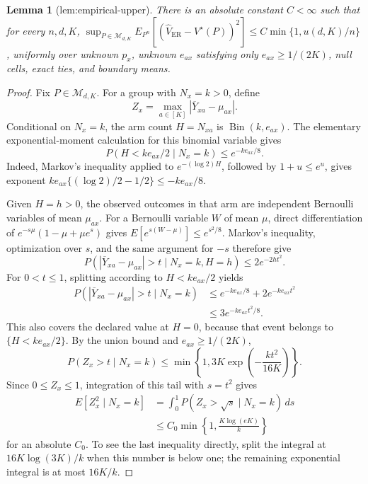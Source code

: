 \documentclass{article}
\newtheorem{lemma}{Lemma}
\begin{document}
\begin{lemma}[lem:empirical-upper]\label{lem:empirical-upper}
There is an absolute constant \(C<\infty\) such that for every \(n,d,K\), \(\sup_{P\in\mathcal M_{d,K}}E_{P^n}[(\widehat V_{\mathrm{ER}}-V^\star(P))^2]\le C\min\{1,u(d,K)/n\}\), uniformly over unknown \(p_x\), unknown \(e_{ax}\) satisfying only \(e_{ax}\ge1/(2K)\), null cells, exact ties, and boundary means.
\end{lemma}
\begin{proof}
Fix \(P\in\mathcal M_{d,K}\).  For a group with \(N_x=k>0\), define
\[
 Z_x=\max_{a\in[K]}|\overline Y_{xa}-\mu_{ax}|.
\]
Conditional on \(N_x=k\), the arm count \(H=N_{xa}\) is \(\operatorname{Bin}(k,e_{ax})\).  The elementary exponential-moment calculation for this binomial variable gives
\[
 P(H<ke_{ax}/2\mid N_x=k)\leq e^{-ke_{ax}/8}.
\]
Indeed, Markov's inequality applied to \(e^{-(\log2)H}\), followed by \(1+u\leq e^u\), gives exponent
\(ke_{ax}\{(\log2)/2-1/2\}\leq-ke_{ax}/8\).

Given \(H=h>0\), the observed outcomes in that arm are independent Bernoulli variables of mean \(\mu_{ax}\).  For a Bernoulli variable \(W\) of mean \(\mu\), direct differentiation of
\(e^{-s\mu}(1-\mu+\mu e^s)\) gives
\(E[e^{s(W-\mu)}]\leq e^{s^2/8}\).  Markov's inequality, optimization over \(s\), and the same argument for \(-s\) therefore give
\[
 P(|\overline Y_{xa}-\mu_{ax}|>t\mid N_x=k,H=h)
 \leq2e^{-2ht^2}.
\]
For \(0<t\leq1\), splitting according to \(H<ke_{ax}/2\) yields
\[
 \begin{aligned}
 P(|\overline Y_{xa}-\mu_{ax}|>t\mid N_x=k)
 &\leq e^{-ke_{ax}/8}+2e^{-ke_{ax}t^2}\\
 &\leq3e^{-ke_{ax}t^2/8}.
 \end{aligned}
\]
This also covers the declared value at \(H=0\), because that event belongs to \(\{H<ke_{ax}/2\}\).  By the union bound and \(e_{ax}\geq1/(2K)\),
\[
 P(Z_x>t\mid N_x=k)
 \leq\min\left\{1,3K\exp\!\left(-\frac{kt^2}{16K}\right)\right\}.
\]
Since \(0\leq Z_x\leq1\), integration of this tail with \(s=t^2\) gives
\[
 \begin{aligned}
 E[Z_x^2\mid N_x=k]
 &=\int_0^1P(Z_x>\sqrt s\mid N_x=k)\,ds\\
 &\leq C_0\min\left\{1,\frac{K\log(eK)}k\right\}
 \end{aligned}
\]
for an absolute \(C_0\).  To see the last inequality directly, split the integral at
\(16K\log(3K)/k\) when this number is below one; the remaining exponential integral is at most \(16K/k\).


\end{proof}
\end{document}
